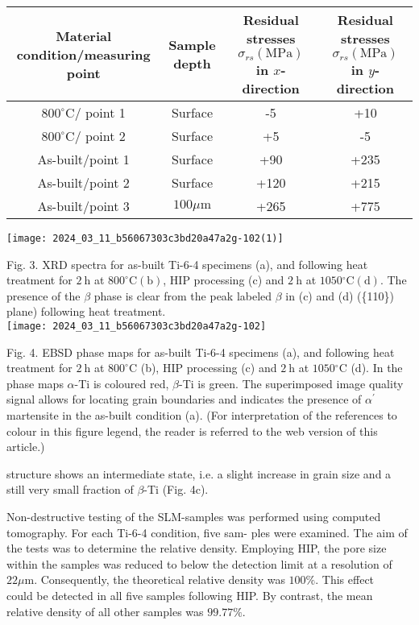 \documentclass[10pt]{article}
\begin{document}
\begin{center}
\begin{tabular}{|c|c|c|c|}
\hline
Material condition/measuring point & Sample depth & Residual stresses $\sigma_{r s}(\mathrm{MPa})$ in $x$-direction & Residual stresses $\sigma_{r s}(\mathrm{MPa})$ in $y$-direction \\
\hline
$800^{\circ} \mathrm{C} /$ point 1 & Surface & -5 & +10 \\
\hline
$800^{\circ} \mathrm{C} /$ point 2 & Surface & +5 & -5 \\
\hline
As-built/point 1 & Surface & +90 & +235 \\
\hline
As-built/point 2 & Surface & +120 & +215 \\
\hline
As-built/point 3 & $100 \mu \mathrm{m}$ & +265 & +775 \\
\hline
\end{tabular}
\end{center}

\begin{center}
\texttt{[image: 2024\_03\_11\_b56067303c3bd20a47a2g-102(1)]}
\end{center}

Fig. 3. XRD spectra for as-built Ti-6-4 specimens (a), and following heat treatment for $2 \mathrm{~h}$ at $800^{\circ} \mathrm{C}(\mathrm{b})$, HIP processing (c) and $2 \mathrm{~h}$ at $1050{ }^{\circ} \mathrm{C}(\mathrm{d})$. The presence of the $\beta$ phase is clear from the peak labeled $\beta$ in (c) and (d) (\{110\}) plane) following heat treatment.\\
\texttt{[image: 2024\_03\_11\_b56067303c3bd20a47a2g-102]}

Fig. 4. EBSD phase maps for as-built Ti-6-4 specimens (a), and following heat treatment for $2 \mathrm{~h}$ at $800^{\circ} \mathrm{C}$ (b), HIP processing (c) and $2 \mathrm{~h}$ at $1050{ }^{\circ} \mathrm{C}$ (d). In the phase maps $\alpha$-Ti is coloured red, $\beta$-Ti is green. The superimposed image quality signal allows for locating grain boundaries and indicates the presence of $\alpha^{\prime}$ martensite in the as-built condition (a). (For interpretation of the references to colour in this figure legend, the reader is referred to the web version of this article.)

structure shows an intermediate state, i.e. a slight increase in grain size and a still very small fraction of $\beta$-Ti (Fig. 4c).

Non-destructive testing of the SLM-samples was performed using computed tomography. For each Ti-6-4 condition, five sam- ples were examined. The aim of the tests was to determine the relative density. Employing HIP, the pore size within the samples was reduced to below the detection limit at a resolution of $22 \mu \mathrm{m}$. Consequently, the theoretical relative density was $100 \%$. This effect\\
could be detected in all five samples following HIP. By contrast, the mean relative density of all other samples was $99.77 \%$.
\end{document}
